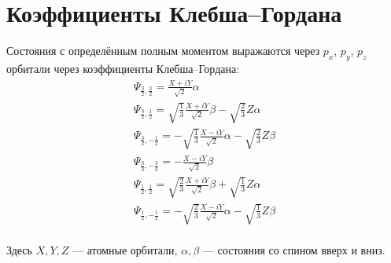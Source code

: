 \section{Коэффициенты Клебша--Гордана}
\label{app:tb}
Состояния с определённым полным моментом выражаются через $p_x$, $p_y$, $p_z$ орбитали через
коэффициенты Клебша--Гордана:
\begin{equation}
	\label{transform1}
	\begin{gathered}
        \Psi_{\frac{3}{2},\frac{3}{2}} = \frac{X + iY}{\sqrt{2}}\alpha\\
        \Psi_{\frac{3}{2}, \frac{1}{2}} = \sqrt{\frac{1}{3}}\frac{X + iY}{\sqrt{2}}\beta -
                                         \sqrt{\frac{2}{3}} Z\alpha\\
        \Psi_{\frac{3}{2}, -\frac{1}{2}} = -\sqrt{\frac{1}{3}}\frac{X - iY}{\sqrt{2}}\alpha -
                                         \sqrt{\frac{2}{3}} Z\beta\\
        \Psi_{\frac{3}{2},-\frac{3}{2}} = -\frac{X - iY}{\sqrt{2}}\beta
	\end{gathered}
\end{equation}
\begin{equation}
	\label{transform2}
	\begin{gathered}
        \Psi_{\frac{1}{2}, \frac{1}{2}} = \sqrt{\frac{2}{3}}\frac{X + iY}{\sqrt{2}}\beta +
                                         \sqrt{\frac{1}{3}} Z\alpha\\
        \Psi_{\frac{1}{2}, -\frac{1}{2}} = -\sqrt{\frac{2}{3}}\frac{X - iY}{\sqrt{2}}\alpha-
                                         \sqrt{\frac{1}{3}} Z\beta\\
	\end{gathered}
\end{equation}

Здесь $X,Y,Z$ --- атомные орбитали, $\alpha,\beta$ --- состояния со спином вверх и вниз.

